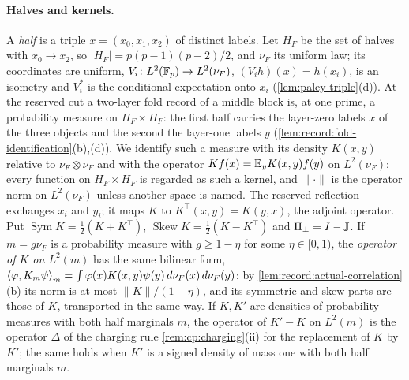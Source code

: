 \paragraph{Halves and kernels.}
A \emph{half} is a triple $x=(x_0,x_1,x_2)$ of distinct labels. Let $H_F$ be
the set of halves with $x_0\to x_2$, so $|H_F|=p(p-1)(p-2)/2$, and $\nu_F$ its
uniform law; its coordinates are uniform, $V_i\colon L^2(\mathbb F_p)\to L^2(\nu_F)$,
$(V_ih)(x)=h(x_i)$, is an isometry and $V_i^*$ is the conditional expectation
onto $x_i$ (\cref{lem:paley-triple}(d)). At the reserved cut a two-layer fold
record of a middle block is, at one prime, a probability measure on
$H_F\times H_F$: the first half carries the layer-zero labels $x$ of the three
objects and the second the layer-one labels $y$
(\cref{lem:record:fold-identification}(b),(d)). We identify such a measure
with its density $K(x,y)$ relative to $\nu_F\otimes\nu_F$ and with the operator
$Kf(x)=\mathbb E_yK(x,y)f(y)$ on $L^2(\nu_F)$; every function on $H_F\times H_F$ is
regarded as such a kernel, and $\|\cdot\|$ is the operator norm on
$L^2(\nu_F)$ unless another space is named. The reserved reflection exchanges
$x_i$ and $y_i$; it maps $K$ to $K^\top(x,y)=K(y,x)$, the adjoint operator.
Put $\operatorname{Sym}K=\frac12(K+K^\top)$,
$\operatorname{Skew}K=\frac12(K-K^\top)$ and $\Pi_\perp=I-\mathbb J$. If
$m=g\nu_F$ is a probability measure with $g\ge1-\eta$ for some $\eta\in[0,1)$, the \emph{operator of
$K$ on $L^2(m)$} has the same bilinear form,
$\left\langle \varphi,K_m\psi\right\rangle_m=\int\varphi(x)K(x,y)\psi(y)\,d\nu_F(x)\,d\nu_F(y)$; by
\cref{lem:record:actual-correlation}(b) its norm is at most $\|K\|/(1-\eta)$,
and its symmetric and skew parts are those of $K$, transported in the same
way. If $K,K'$ are densities of probability measures with both half marginals
$m$, the operator of $K'-K$ on $L^2(m)$ is the operator $\Delta$ of the charging
rule \cref{rem:cp:charging}(ii) for the replacement of $K$ by $K'$; the same
holds when $K'$ is a signed density of mass one with both half marginals $m$.

